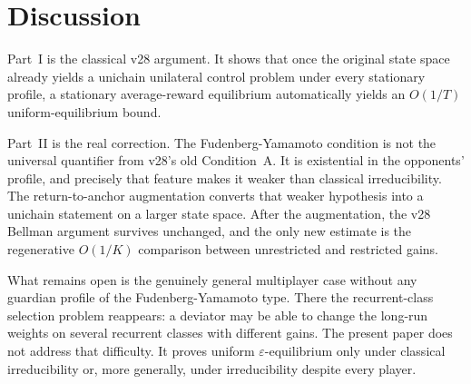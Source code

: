 \documentclass[11pt]{article}
\theoremstyle{definition}
\newcommand{\1}{\mathbf{1}}
\begin{document}
\section{Discussion}\label{sec:discussion-new}

Part~I is the classical v28 argument. It shows that once the original state space already yields a unichain unilateral control problem under every stationary profile, a stationary average-reward equilibrium automatically yields an $O(1/T)$ uniform-equilibrium bound.

Part~II is the real correction. The Fudenberg-Yamamoto condition is not the universal quantifier from v28's old Condition~A. It is existential in the opponents' profile, and precisely that feature makes it weaker than classical irreducibility. The return-to-anchor augmentation converts that weaker hypothesis into a unichain statement on a larger state space. After the augmentation, the v28 Bellman argument survives unchanged, and the only new estimate is the regenerative $O(1/K)$ comparison between unrestricted and restricted gains.

What remains open is the genuinely general multiplayer case without any guardian profile of the Fudenberg-Yamamoto type. There the recurrent-class selection problem reappears: a deviator may be able to change the long-run weights on several recurrent classes with different gains. The present paper does not address that difficulty. It proves uniform $\varepsilon$-equilibrium only under classical irreducibility or, more generally, under irreducibility despite every player.
\end{document}
